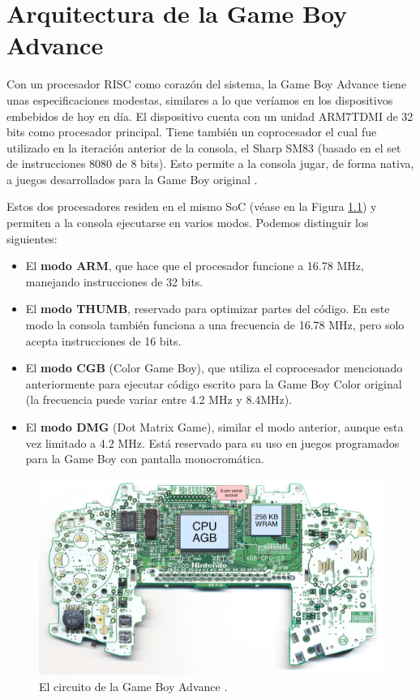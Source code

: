 \chapter{Arquitectura de la Game Boy Advance}\label{sec:arquitectura}

Con un procesador RISC como corazón del sistema, la Game Boy Advance tiene unas especificaciones modestas, similares a lo que veríamos en los dispositivos embebidos de hoy en día. El dispositivo cuenta con un unidad ARM7TDMI de 32 bits como procesador principal. Tiene también un coprocesador el cual fue utilizado en la iteración anterior de la consola, el Sharp SM83 (basado en el set de instrucciones 8080 de 8 bits). Esto permite a la consola jugar, de forma nativa, a juegos desarrollados para la Game Boy original \cite{bib:rodrigo}. 

Estos dos procesadores residen en el mismo SoC (véase en la Figura \ref{fig:circuit}) y permiten a la consola ejecutarse en varios modos. Podemos distinguir los siguientes:
\begin{itemize}
\item El \textbf{modo ARM}, que hace que el procesador funcione a 16.78 MHz, manejando instrucciones de 32 bits.
\item El \textbf{modo THUMB}, reservado para optimizar partes del código. En este modo la consola también funciona a una frecuencia de 16.78 MHz, pero solo acepta instrucciones de 16 bits.
\item El \textbf{modo CGB} (Color Game Boy), que utiliza el coprocesador mencionado anteriormente para ejecutar código escrito para la Game Boy Color original (la frecuencia puede variar entre 4.2 MHz y 8.4MHz).
\item El \textbf{modo DMG} (Dot Matrix Game), similar el modo anterior, aunque esta vez limitado a 4.2 MHz. Está reservado para su uso en juegos programados para la Game Boy con pantalla monocromática.
\end{itemize}

\begin{figure}[t]
    \centering
    \includegraphics[width=.8\textwidth]{capitulos/capitulo2/circuit.jpg}
    \caption{El circuito de la Game Boy Advance \cite{bib:rodrigo}.}
    \label{fig:circuit}
\end{figure}


